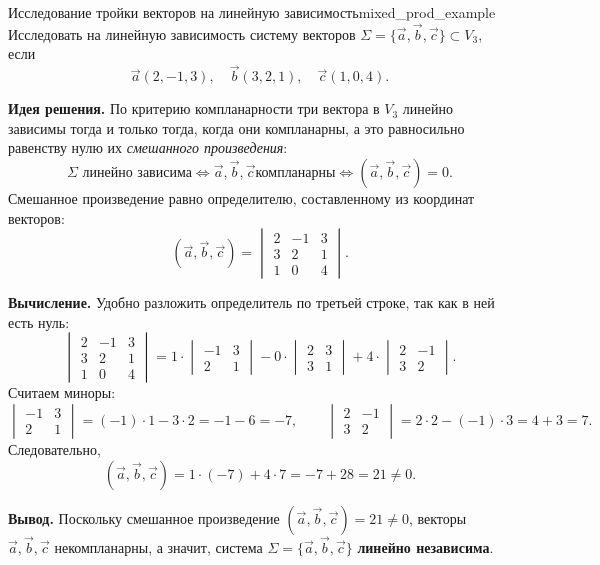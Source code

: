 \documentclass[12pt,a4paper]{article}
\begin{document}
\begin{definition}{Исследование тройки векторов на линейную
зависимость}{mixed_prod_example}
Исследовать на линейную зависимость систему векторов $\Sigma =
\{\vec{a}, \vec{b}, \vec{c}\} \subset V_3$, если
\[
\vec{a}(2, -1, 3), \quad \vec{b}(3, 2, 1), \quad \vec{c}(1, 0, 4).
\]

\textbf{Идея решения.} По критерию компланарности три вектора в $V_3$
линейно зависимы тогда и только тогда, когда они компланарны, а это
равносильно равенству нулю их \emph{смешанного произведения}:
\[
\Sigma \text{ линейно зависима} \iff \vec{a}, \vec{b}, \vec{c} \text{
компланарны} \iff (\vec{a}, \vec{b}, \vec{c}) = 0.
\]
Смешанное произведение равно определителю, составленному из координат
векторов:
\[
(\vec{a}, \vec{b}, \vec{c}) =
\begin{vmatrix}
  2 & -1 & 3 \\
  3 & 2 & 1 \\
  1 & 0 & 4
\end{vmatrix}.
\]

\textbf{Вычисление.} Удобно разложить определитель по третьей строке,
так как в ней есть нуль:
\[
\begin{vmatrix}
  2 & -1 & 3 \\
  3 & 2 & 1 \\
  1 & 0 & 4
\end{vmatrix}
= 1 \cdot
\begin{vmatrix} -1 & 3 \\ 2 & 1
\end{vmatrix}
- 0 \cdot
\begin{vmatrix} 2 & 3 \\ 3 & 1
\end{vmatrix}
+ 4 \cdot
\begin{vmatrix} 2 & -1 \\ 3 & 2
\end{vmatrix}.
\]
Считаем миноры:
\[
\begin{vmatrix} -1 & 3 \\ 2 & 1
\end{vmatrix} = (-1)\cdot 1 - 3\cdot 2
= -1 - 6 = -7,
\qquad
\begin{vmatrix} 2 & -1 \\ 3 & 2
\end{vmatrix} = 2\cdot 2 - (-1)\cdot 3
= 4 + 3 = 7.
\]
Следовательно,
\[
(\vec{a}, \vec{b}, \vec{c}) = 1\cdot(-7) + 4\cdot 7 = -7 + 28 = 21
\neq 0.
\]

\textbf{Вывод.} Поскольку смешанное произведение $(\vec{a}, \vec{b},
\vec{c}) = 21 \neq 0$, векторы $\vec{a}, \vec{b}, \vec{c}$
некомпланарны, а значит, система $\Sigma = \{\vec{a}, \vec{b}, \vec{c}\}$
\textbf{линейно независима}.
\end{definition}
\end{document}
